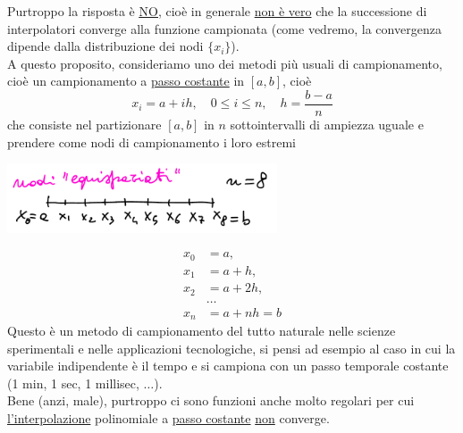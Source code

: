 Purtroppo la risposta è \uline{\uline{NO}}, cioè in generale \uline{non è vero} che la successione di interpolatori converge alla funzione campionata (come vedremo, la convergenza dipende dalla distribuzione dei nodi $\{x_i\}$).\\
A questo proposito, consideriamo uno dei metodi più usuali di campionamento, cioè un campionamento a \uline{passo costante} in $[a,b]$, cioè
\[ x_i = a+ih, \quad 0\le i \le n, \quad h = \frac{b-a}{n} \]
che consiste nel partizionare $[a,b]$ in $n$ sottointervalli di ampiezza uguale e prendere come nodi di campionamento i loro estremi
\begin{center}
    \includegraphics[width=0.6\textwidth]{foto/lez12_img4}
\end{center}
\[ \begin{split}
    x_0 & = a, \\
    x_1 & = a + h, \\
    x_2 & = a + 2h, \\
    & \dotso \\
    x_n & = a+nh = b
\end{split} \]
Questo è un metodo di campionamento del tutto naturale nelle scienze sperimentali e nelle applicazioni tecnologiche, si pensi ad esempio al caso in cui la variabile indipendente è il tempo e si campiona con un passo temporale costante (1 min, 1 sec, 1 millisec, $\dotso$).\\
Bene (anzi, male), purtroppo ci sono funzioni anche molto regolari per cui \uline{l'interpolazione} polinomiale a \uline{passo costante} \uline{non} converge.

